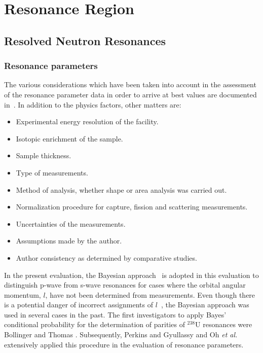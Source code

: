 \documentclass[twocolumn,amsmath,amssymb,10pt,groupedaddress,a4paper]{revtex4}
\begin{document}
\section{Resonance Region}
\subsection{Resolved Neutron Resonances }

\subsubsection{Resonance parameters}
The  various considerations which have been taken into account in the assessment
of the resonance parameter data in order to arrive at best values are documented
in~\cite{Mughabghab:06}. In addition to the physics factors, other matters are:
\begin{itemize}
\item  Experimental  energy resolution of the facility.
\item Isotopic enrichment of the sample.
\item Sample thickness.
\item Type of measurements.
\item Method of analysis, whether shape or area analysis was carried out.
\item Normalization procedure for capture, fission and scattering measurements.
\item Uncertainties of the measurements.
\item Assumptions made by the author.
\item Author consistency as determined by comparative studies.
\end{itemize}
 In the present evaluation, the Bayesian approach~\cite{Mughabghab:06,Smith:91} is adopted in this evaluation to
distinguish p-wave from s-wave
resonances for cases where the orbital angular momentum, $l$, have not been determined from measurements. Even though there
is a potential danger of incorrect assignments of $l$~\cite{Garg:81}, the Bayesian approach was used in several cases in
the past. The first investigators to apply Bayes' conditional probability for the determination of parities of $^{238}$U
resonances were Bollinger and Thomas \cite{Bollinger:68}. Subsequently, Perkins and Gyullassy \cite{Perkins:72} and
Oh {\it et al.}~\cite{Oh:00} extensively applied this procedure in the evaluation of resonance parameters.
\end{document}
